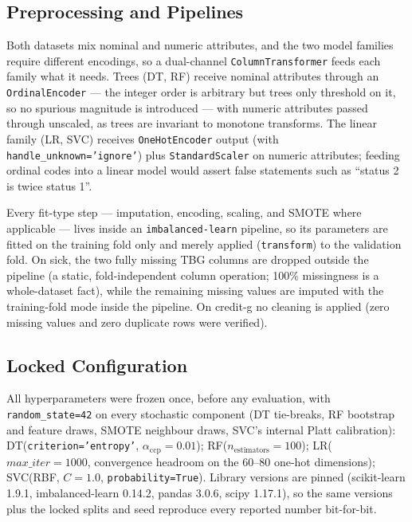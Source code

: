 \subsection{Preprocessing and Pipelines}
Both datasets mix nominal and numeric attributes, and the two model
families require different encodings, so a dual-channel
\texttt{ColumnTransformer} feeds each family what it needs. Trees
(DT, RF) receive nominal attributes through an \texttt{OrdinalEncoder}
--- the integer order is arbitrary but trees only threshold on it, so
no spurious magnitude is introduced --- with numeric attributes passed
through unscaled, as trees are invariant to monotone transforms. The
linear family (LR, SVC) receives \texttt{OneHotEncoder} output (with
\texttt{handle\_unknown='ignore'}) plus \texttt{StandardScaler} on
numeric attributes; feeding ordinal codes into a linear model would
assert false statements such as ``status 2 is twice status 1''.

Every fit-type step --- imputation, encoding, scaling, and SMOTE where
applicable --- lives inside an \texttt{imbalanced-learn} pipeline, so
its parameters are fitted on the training fold only and merely applied
(\texttt{transform}) to the validation fold. On sick, the two fully
missing TBG columns are dropped outside the pipeline (a static,
fold-independent column operation; 100\% missingness is a whole-dataset
fact), while the remaining missing values are imputed with the
training-fold mode inside the pipeline. On credit-g no cleaning is
applied (zero missing values and zero duplicate rows were verified).

\subsection{Locked Configuration}
All hyperparameters were frozen once, before any evaluation, with
\texttt{random\_state=42} on every stochastic component (DT tie-breaks,
RF bootstrap and feature draws, SMOTE neighbour draws, SVC's internal
Platt calibration): DT(\texttt{criterion='entropy'},
$\alpha_{\text{ccp}}=0.01$); RF($n_{\text{estimators}}=100$);
LR($\textit{max\_iter}=1000$, convergence headroom on the 60--80
one-hot dimensions); SVC(RBF, $C=1.0$, \texttt{probability=True}).
Library versions are pinned (scikit-learn 1.9.1, imbalanced-learn
0.14.2, pandas 3.0.6, scipy 1.17.1), so the same versions plus the
locked splits and seed reproduce every reported number bit-for-bit.

